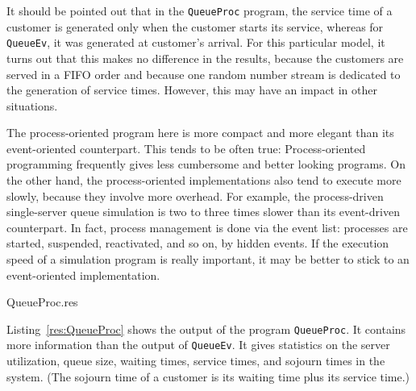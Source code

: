 It should be pointed out that in the \texttt{QueueProc} program,
the service time of a customer is generated
only when the customer starts its service, whereas for \texttt{QueueEv},
it was generated at customer's arrival.
For this particular model, it turns out that this makes no difference
in the results, because the customers are served in a FIFO order
and because one random number stream is dedicated to the generation
of service times.
However, this may have an impact in other situations.

The process-oriented program here is more compact and
more elegant than its event-oriented counterpart.
This tends to be often true: Process-oriented programming
frequently gives less cumbersome and better looking programs.
On the other hand, the process-oriented implementations also tend to
execute more slowly, because they involve more overhead.
For example, the process-driven single-server queue simulation
is two to three times slower than its event-driven counterpart.
In fact, process management is done via the event list:
processes are started, suspended, reactivated, and so on,
by hidden events.
If the execution speed of a simulation program is really important,
it may be better to stick to an event-oriented implementation.

%
{QueueProc.res}


\iffalse %
\setbox5=\vbox{\hsize=5.8in
\begin{verbatim}
REPORT ON RESOURCE : Server
  From time : 0.0    to time : 1000.0
                 min          max      average    Std. Dev.  num.obs.
  Capacity        1            1          1
  Utilisation     0            1         0.999
  Queue Size      0           12         4.85
  Wait            0         113.721     49.554     22.336      97
  Service        0.065       41.021     10.378     10.377      96
  Sojourn       12.828      124.884     60.251     21.352      96

\end{verbatim}
}

\begin{figure}[htb]
\centerline {\boxit{\box5}}
\caption {Results of the program \texttt{QueueProc}.}
\label {fig:quresProc}
\end{figure}
\fi  %

Listing~\ref{res:QueueProc} shows the output of the program \texttt{QueueProc}.
It contains more information than the output of \texttt{QueueEv}.
It gives statistics on the server utilization, queue size,
waiting times, service times, and sojourn times in the system.
(The sojourn time of a customer is its waiting time plus its service time.)

